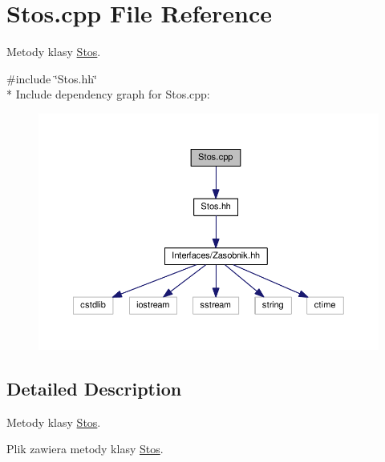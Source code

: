\hypertarget{a00055}{}\section{Stos.\+cpp File Reference}
\label{a00055}


Metody klasy \hyperlink{a00018}{Stos}.  


{\ttfamily \#include \char`\"{}Stos.\+hh\char`\"{}}\\*
Include dependency graph for Stos.\+cpp\+:
\nopagebreak
\begin{figure}[H]
\begin{center}
\leavevmode
\includegraphics[width=350pt]{a00111}
\end{center}
\end{figure}


\subsection{Detailed Description}
Metody klasy \hyperlink{a00018}{Stos}. 

Plik zawiera metody klasy \hyperlink{a00018}{Stos}. 